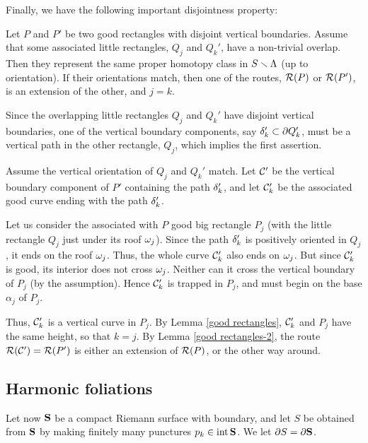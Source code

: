 Finally, we have the following important disjointness property: 

\begin{prop}\label{disjointness}
   Let $P$ and $P'$ be two good rectangles %
with disjoint vertical boundaries. 
Assume that some associated little rectangles, $Q_j$ and $Q_k'$, have
a non-trivial overlap. 
Then they represent the same proper homotopy class in $S\smallsetminus {\Lambda}$ (up to orientation).
If their orientations match,
then one of the routes, ${\cal R}(P)$ or ${\cal R}(P')$, is an extension of the other,
and $j=k$.
\end{prop} 

\begin{pf}
Since the overlapping little rectangles $Q_j$ and $Q_k'$ have  disjoint vertical  boundaries, 
one of the vertical  boundary components, say  ${\delta}_k' \subset \partial Q_k'$, 
must be a vertical path in the other rectangle, $Q_j$, which implies the first assertion. 

Assume the vertical orientation of $Q_j$ and $Q_k'$ match.
Let ${\cal C}'$ be the vertical boundary component of $P'$ containing the path ${\delta}_k'$,
and let ${\cal C}_k'$ be the associated good curve ending with the path ${\delta}_k'$.

Let us consider the associated with $P$ good big rectangle $P_j$ 
(with the little rectangle  $Q_j$ just under its roof ${\omega}_j$).
Since the path ${\delta}_k'$ is positively oriented in $Q_j$,
it ends on the roof ${\omega}_j$. Thus, the whole curve ${\cal C}_k'$ also ends on ${\omega}_j$. 
But  since ${\cal C}_k'$ is good, its interior does not cross ${\omega}_j$.
Neither can it cross the vertical boundary of $P_j$ (by the assumption).
Hence ${\cal C}_k'$ is trapped in $P_j$, and must begin on the base $\alpha_j$ of $P_j$. 

Thus, ${\cal C}_k'$ is a vertical curve in $P_j$.
By Lemma \ref{good rectangles}, ${\cal C}_k'$ and $P_j$ have the same height, so that $k=j$.  
By Lemma \ref{good rectangles-2}, the route ${\cal R}({\cal C}')={\cal R}(P')$ is either an extension of ${\cal R}(P)$,
or the other way around.  
\end{pf}



\subsection{Harmonic foliations}\label{Vert fol} 

Let now ${\mathbf{S}}$ be a compact Riemann surface with boundary, and let $S$ be obtained from ${\mathbf{S}}$ by
making finitely many punctures $p_k\in \operatorname{int} {\mathbf{S}}$. We let $\partial S= \partial {\mathbf{S}}$.  

